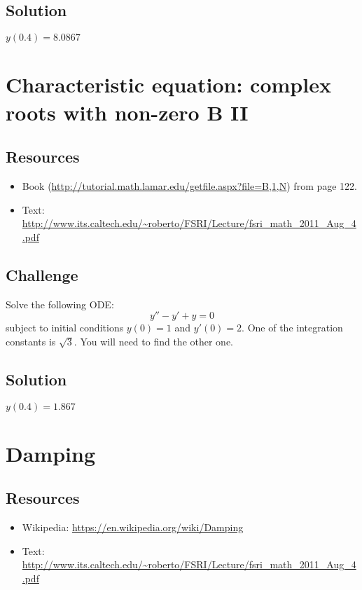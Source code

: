 \subsection*{Solution}
$y(0.4)=8.0867$




\newpage
\section{Characteristic equation: complex roots with non-zero B II}

\subsection*{Resources}
\begin{itemize}
    \item Book (\url{http://tutorial.math.lamar.edu/getfile.aspx?file=B,1,N}) from page 122.
    \item Text: \url{http://www.its.caltech.edu/~roberto/FSRI/Lecture/fsri_math_2011_Aug_4.pdf}
\end{itemize}

\subsection*{Challenge}
Solve the following ODE:
\begin{equation}
    y'' - y' + y = 0
\end{equation}
subject to initial conditions $y(0)=1$ and $y'(0)=2$. One of the integration constants is $\sqrt{3}$. You will need to find the other one.

\subsection*{Solution}
$y(0.4)=1.867$




\newpage
\section{Damping}
\label{sec:damping}

\subsection*{Resources}
\begin{itemize}
    \item Wikipedia: \url{https://en.wikipedia.org/wiki/Damping}
    \item Text: \url{http://www.its.caltech.edu/~roberto/FSRI/Lecture/fsri_math_2011_Aug_4.pdf}
\end{itemize}


